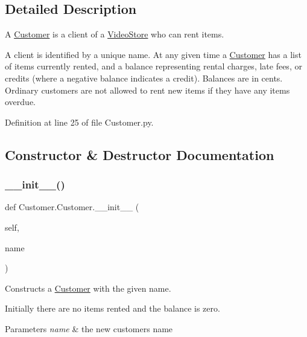 \subsection{Detailed Description}
A \hyperlink{classCustomer_1_1Customer}{Customer} is a client of a \hyperlink{namespaceVideoStore}{Video\+Store} who can rent items. 

A client is identified by a unique name. At any given time a \hyperlink{classCustomer_1_1Customer}{Customer} has a list of items currently rented, and a balance representing rental charges, late fees, or credits (where a negative balance indicates a credit). Balances are in cents. Ordinary customers are not allowed to rent new items if they have any items overdue. 

Definition at line 25 of file Customer.\+py.



\subsection{Constructor \& Destructor Documentation}
\mbox{\label{classCustomer_1_1Customer_a9a6e72f7972ab6669244ee32b5c15fa8}} 
\subsubsection{\texorpdfstring{\+\_\+\+\_\+init\+\_\+\+\_\+()}{\_\_init\_\_()}}
{\footnotesize\ttfamily def Customer.\+Customer.\+\_\+\+\_\+init\+\_\+\+\_\+ (\begin{DoxyParamCaption}\item[{}]{self,  }\item[{}]{name }\end{DoxyParamCaption})}



Constructs a \hyperlink{classCustomer_1_1Customer}{Customer} with the given name. 

Initially there are no items rented and the balance is zero. 
\begin{DoxyParams}{Parameters}
{\em name} & the new customer\textquotesingle{}s name \\
\hline
\end{DoxyParams}


